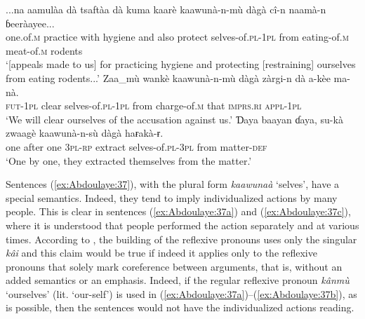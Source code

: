 \documentclass[output=paper]{langscibook}
\begin{document}
\ea%
    \label{ex:Abdoulaye:37}
    \ea \label{ex:Abdoulaye:37a}
     \gll ...na  aamulàa  dà  tsaftàa  dà  kuma  kaarè  kaawunà-n-mù dàgà  cî-n  naamà-n  ɓeeràayee...\\
     one.of.\textsc{m}  practice  with  hygiene  and  also  protect  selves-of.\textsc{pl-1pl} from  eating-of.\textsc{m}  meat-of.\textsc{m}  rodents\\
     \glt `[appeals made to us] for practicing hygiene and protecting [restraining] ourselves from eating rodents...’
     \ex \label{ex:Abdoulaye:37b}
     \gll  Zaa\_mù  wankè  kaawunà-n-mù  dàgà  zàrgi-n  dà  a-kèe  ma-nà.\\
    \textsc{fut-1pl}  clear  selves-of.\textsc{pl-1pl}  from  charge{}-of.\textsc{m}  that  \textsc{imprs.ri}  \textsc{appl-1pl}\\
    \glt `We will clear ourselves of the accusation against us.’
    \ex \label{ex:Abdoulaye:37c}
     \gll Ɗaya  baayan  ɗaya,  su-kà  zwaagè  kaawunà-n-sù  dàgà  haɍakà-ɍ.\\
    one  after  one  \textsc{3pl-rp}  extract  selves-of.\textsc{pl-3pl}  from  matter-\textsc{def}\\
    \glt `One by one, they extracted themselves from the matter.’
    \z
\z
  
   

Sentences (\ref{ex:Abdoulaye:37}), with the plural form \textit{kaawunaà} ‘selves’, have a special semantics. Indeed, they tend to imply individualized actions by many people. This is clear in sentences (\ref{ex:Abdoulaye:37a}) and (\ref{ex:Abdoulaye:37c}), where it is understood that people performed the action separately and at various times. According to \citet[485]{Newman2000}, the building of the reflexive pronouns uses only the singular \textit{kâi} and this claim would be true if indeed it applies only to the reflexive pronouns that solely mark coreference between arguments, that is, without an added semantics or an emphasis. Indeed, if the regular reflexive pronoun \textit{kânmù} ‘ourselves’ (lit. ‘our-self’) is used in (\ref{ex:Abdoulaye:37a})--(\ref{ex:Abdoulaye:37b}), as is possible, then the sentences would not have the individualized actions reading.
\end{document}

